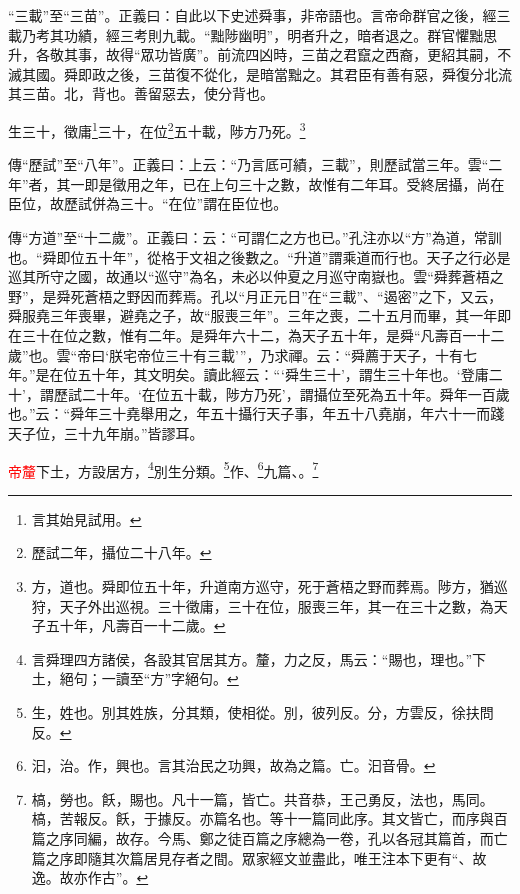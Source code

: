 {\noindent\shu{}\fzkt “三載”至“三苗”。正義曰：自此以下史述舜事，非帝語也。言帝命群官之後，經三載乃考其功績，經三考則九載。“黜陟幽明”，明者升之，暗者退之。群官懼黜思升，各敬其事，故得“眾功皆廣”。前流四凶時，三苗之君竄之西裔，更紹其嗣，不滅其國。舜即政之後，三苗復不從化，是暗當黜之。其君臣有善有惡，舜復分北流其三苗。北，背也。善留惡去，使分背也。 \par}

生三十，徵庸\footnote{言其始見試用。}三十，在位\footnote{歷試二年，攝位二十八年。}五十載，陟方乃死。\footnote{方，道也。舜即位五十年，升道南方巡守，死于蒼梧之野而葬焉。陟方，猶巡狩，天子外出巡視。三十徵庸，三十在位，服喪三年，其一在三十之數，為天子五十年，凡壽百一十二歲。}

{\noindent\zhuan{}\fzbyks 傳“歷試”至“八年”。正義曰：上云：“乃言厎可績，三載”，則歷試當三年。雲“二年”者，其一即是徵用之年，已在上句三十之數，故惟有二年耳。受終居攝，尚在臣位，故歷試併為三十。“在位”謂在臣位也。 \par}

{\noindent\zhuan{}\fzbyks 傳“方道”至“十二歲”。正義曰：云：“可謂仁之方也已。”孔注亦以“方”為道，常訓也。“舜即位五十年”，從格于文祖之後數之。“升道”謂乘道而行也。天子之行必是巡其所守之國，故通以“巡守”為名，未必以仲夏之月巡守南嶽也。雲“舜葬蒼梧之野”，是舜死蒼梧之野因而葬焉。孔以“月正元日”在“三載”、“遏密”之下，又云，舜服堯三年喪畢，避堯之子，故“服喪三年”。三年之喪，二十五月而畢，其一年即在三十在位之數，惟有二年。是舜年六十二，為天子五十年，是舜“凡壽百一十二歲”也。雲“帝曰‘朕宅帝位三十有三載’”，乃求禪。云：“舜薦于天子，十有七年。”是在位五十年，其文明矣。讀此經云：“‘舜生三十’，謂生三十年也。‘登庸二十’，謂歷試二十年。‘在位五十載，陟方乃死’，謂攝位至死為五十年。舜年一百歲也。”云：“舜年三十堯舉用之，年五十攝行天子事，年五十八堯崩，年六十一而踐天子位，三十九年崩。”皆謬耳。 \par}

\textcolor{red}{帝釐}下土，方設居方，\footnote{言舜理四方諸侯，各設其官居其方。釐，力之反，馬云：“賜也，理也。”下土，絕句；一讀至“方”字絕句。}別生分類。\footnote{生，姓也。別其姓族，分其類，使相從。別，彼列反。分，方雲反，徐扶問反。}作、\footnote{汩，治。作，興也。言其治民之功興，故為之篇。亡。汩音骨。}九篇、\CJKunderwave{\textcolor{red}{槁飫}}。\footnote{槁，勞也。飫，賜也。凡十一篇，皆亡。共音恭，王己勇反，法也，馬同。槁，苦報反。飫，于據反。亦篇名也。等十一篇同此序。其文皆亡，而序與百篇之序同編，故存。今馬、鄭之徒百篇之序總為一卷，孔以各冠其篇首，而亡篇之序即隨其次篇居見存者之間。眾家經文並盡此，唯王注本下更有“、故逸。故亦作古”。}

